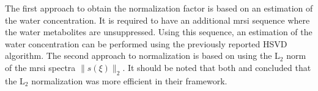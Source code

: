 \begin{enumerate}[leftmargin=*]
The first approach to obtain the normalization factor is based on an estimation of the water concentration. It is required to have an additional \ac{mrsi} sequence where the water metabolites are unsuppressed. Using this sequence, an estimation of the water concentration can be performed using the previously reported HSVD algorithm.  The second approach to normalization is based on using the L$_2$ norm of the \ac{mrsi} spectra $\|s(\xi)\|_2$. 
It should be noted that both \cite{Parfait2012} and \cite{Devos2004} concluded that the L$_2$ normalization was more efficient in their framework.
 
\end{enumerate}